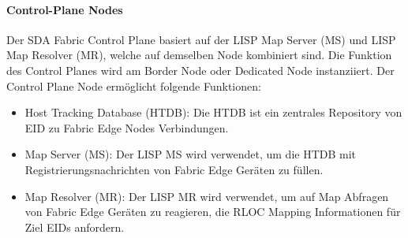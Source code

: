 \paragraph{Control-Plane Nodes}
Der SDA Fabric Control Plane basiert auf der LISP Map Server (MS) und LISP Map Resolver (MR), welche auf demselben Node kombiniert sind. Die Funktion des Control Planes wird am Border Node oder Dedicated Node instanziiert. Der Control Plane Node ermöglicht folgende Funktionen: \cite{sda-designguide}
\begin{itemize}	
	\item Host Tracking Database (HTDB): Die HTDB ist ein zentrales Repository von EID zu Fabric Edge Nodes Verbindungen.
	\item Map Server (MS): Der LISP MS wird verwendet, um die HTDB mit Registrierungsnachrichten von Fabric Edge Geräten zu füllen.
	\item Map Resolver (MR): Der LISP MR wird verwendet, um auf Map Abfragen von Fabric Edge Geräten zu reagieren, die RLOC Mapping Informationen für Ziel EIDs anfordern.
\end{itemize}

